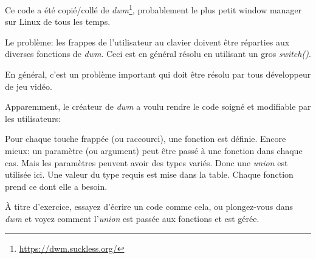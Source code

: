 
Ce code a été copié/collé de \emph{dwm}\footnote{\url{https://dwm.suckless.org/}},
probablement le plus petit window manager sur Linux de tous les temps.

Le problème: les frappes de l'utilisateur au clavier doivent être réparties aux diverses
fonctions de \emph{dwm}.
Ceci est en général résolu en utilisant un gros \emph{switch()}.

En général, c'est un problème important qui doit être résolu par tous développeur
de jeu vidéo.

Apparemment, le créateur de \emph{dwm} a voulu rendre le code soigné et modifiable
par les utilisateurs:



Pour chaque touche frappée (ou raccourci), une fonction est définie.
Encore mieux: un paramètre (ou argument) peut être passé à une fonction dans chaque
cas.
Mais les paramètres peuvent avoir des types variés.
Donc une \emph{union} est utilisée ici.
Une valeur du type requis est mise dans la table.
Chaque fonction prend ce dont elle a besoin.

À titre d'exercice, essayez d'écrire un code comme cela, ou plongez-vous dans \emph{dwm}
et voyez comment l'\emph{union} est passée aux fonctions et est gérée.

